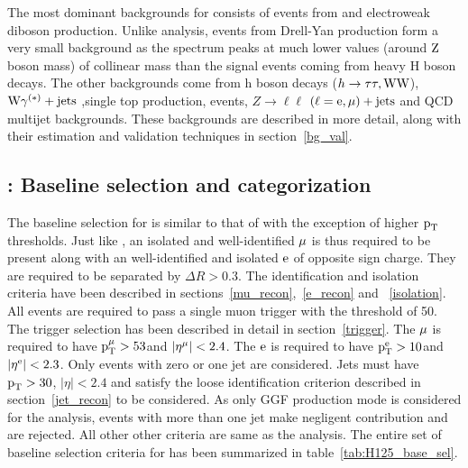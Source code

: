 The most dominant backgrounds for \Hmue consists of events from  \ttb and electroweak diboson production. Unlike \hmue analysis, \ztt events from Drell-Yan production form a very small background as the \ztt spectrum peaks at much lower values (around $\text{Z}$ boson mass) of collinear mass than the signal events coming from heavy H boson decays. The other backgrounds come from h boson decays ($h \to \tau\tau,\text{W}\text{W}$), $\text{W}\gamma^{(*)}+\text{jets}$ ,single top production, \wjets events, $Z\to\ell\ell$ $(\ell = \text{e}, \mu)+\text{jets}$ and QCD multijet backgrounds. These backgrounds are described in more detail, along with their estimation and validation techniques in section~\ref{bg_val}.        

\subsection{\Hmue: Baseline selection and categorization}
\label{H_presel_cat}
The baseline selection for \Hmue is similar to that of \hmue with the exception of higher $\text{p}_\text{T}$ thresholds. Just like \hmue, an isolated and well-identified $\mu$ is thus required to be present along with an well-identified and isolated $\text{e}$ of opposite sign charge. They are required to be separated by $\Delta R > 0.3$. The identification and isolation criteria have been described in sections~\ref{mu_recon},~\ref{e_recon} and ~\ref{isolation}. All events are required to pass a single muon trigger with the threshold of 50\GeV. The trigger selection has been described in detail in section~\ref{trigger}. The $\mu$ is required to have $\text{p}_\text{T}^{\mu} > 53$\GeV and $|\eta^{\mu}|<2.4$. The $\text{e}$ is required to have $\text{p}_\text{T}^{\text{e}} > 10$\GeV and $|\eta^{\text{e}}|<2.3$. Only events with zero or one jet are considered. Jets  must have $\text{p}_\text{T}>30$\GeV, $|\eta| < 2.4 $ and satisfy the loose identification criterion described in section~\ref{jet_recon} to be considered. As only GGF production mode is considered for the \Hmue analysis, events with more than one jet make negligent contribution and are rejected. All other other criteria are same as the \hmue analysis. The entire set of baseline selection criteria for \Hmue has been summarized in table~\ref{tab:H125_base_sel}.


